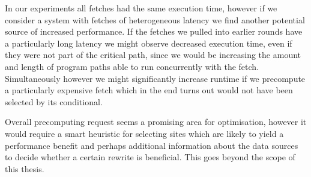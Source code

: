 In our experiments all fetches had the same execution time, however if we consider a system with fetches of heterogeneous latency we find another potential source of increased performance.
If the fetches we pulled into earlier rounds have a particularly long latency we might observe decreased execution time, even if they were not part of the critical path, since we would be increasing the amount and length of program paths able to run concurrently with the fetch.
Simultaneously however we might significantly increase runtime if we precompute a particularly expensive fetch which in the end turns out would not have been selected by its conditional.

Overall precomputing request seems a promising area for optimisation, however it would require a smart heuristic for selecting sites which are likely to yield a performance benefit and perhaps additional information about the data sources to decide whether a certain rewrite is beneficial.
This goes beyond the scope of this thesis.
